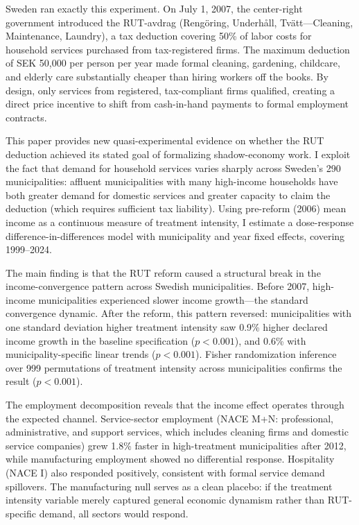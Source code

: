 \documentclass[12pt]{article}
\begin{document}
Sweden ran exactly this experiment. On July 1, 2007, the center-right government introduced the RUT-avdrag (Reng\"{o}ring, Underh\r{a}ll, Tv\"{a}tt---Cleaning, Maintenance, Laundry), a tax deduction covering 50\% of labor costs for household services purchased from tax-registered firms. The maximum deduction of SEK 50,000 per person per year made formal cleaning, gardening, childcare, and elderly care substantially cheaper than hiring workers off the books. By design, only services from registered, tax-compliant firms qualified, creating a direct price incentive to shift from cash-in-hand payments to formal employment contracts.

This paper provides new quasi-experimental evidence on whether the RUT deduction achieved its stated goal of formalizing shadow-economy work. I exploit the fact that demand for household services varies sharply across Sweden's 290 municipalities: affluent municipalities with many high-income households have both greater demand for domestic services and greater capacity to claim the deduction (which requires sufficient tax liability). Using pre-reform (2006) mean income as a continuous measure of treatment intensity, I estimate a dose-response difference-in-differences model with municipality and year fixed effects, covering 1999--2024.

The main finding is that the RUT reform caused a structural break in the income-convergence pattern across Swedish municipalities. Before 2007, high-income municipalities experienced slower income growth---the standard convergence dynamic. After the reform, this pattern reversed: municipalities with one standard deviation higher treatment intensity saw 0.9\% higher declared income growth in the baseline specification ($p < 0.001$), and 0.6\% with municipality-specific linear trends ($p < 0.001$). Fisher randomization inference over 999 permutations of treatment intensity across municipalities confirms the result ($p < 0.001$).

The employment decomposition reveals that the income effect operates through the expected channel. Service-sector employment (NACE M+N: professional, administrative, and support services, which includes cleaning firms and domestic service companies) grew 1.8\% faster in high-treatment municipalities after 2012, while manufacturing employment showed no differential response. Hospitality (NACE I) also responded positively, consistent with formal service demand spillovers. The manufacturing null serves as a clean placebo: if the treatment intensity variable merely captured general economic dynamism rather than RUT-specific demand, all sectors would respond.
\end{document}
